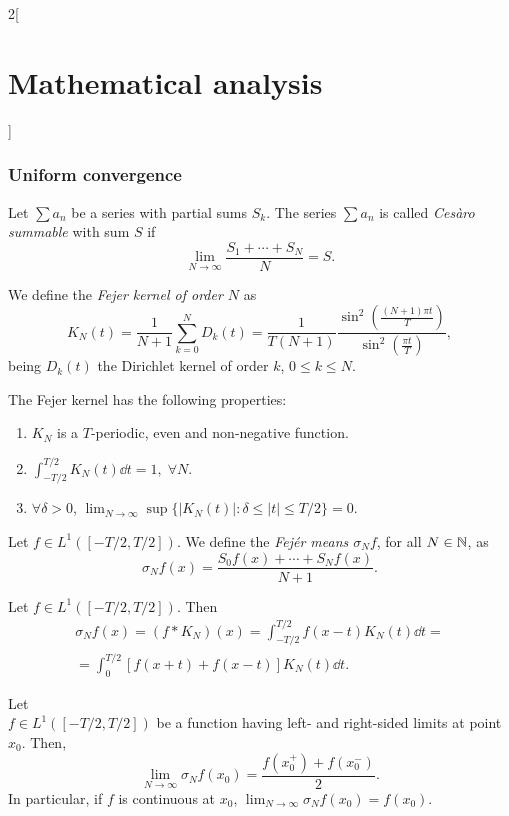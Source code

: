\documentclass[../../../main.tex]{subfiles}
\begin{document}
\begin{multicols}{2}[\section{Mathematical analysis}]
\subsubsection*{Uniform convergence}
\begin{definition}
Let $\sum a_n$ be a series with partial sums $S_k$. The series $\sum a_n$ is called \textit{Cesàro summable} with sum $S$ if $$\lim_{N\to\infty}\frac{S_1+\cdots+S_N}{N}=S.$$
\end{definition}
\begin{definition}
We define the \textit{Fejer kernel of order $N$} as $$K_N(t)=\frac{1}{N+1}\sum_{k=0}^ND_k(t)=\frac{1}{T(N+1)}\frac{\sin^2\left(\frac{(N+1)\pi t}{T}\right)}{\sin^2\left(\frac{\pi t}{T}\right)},$$ being $D_k(t)$ the Dirichlet kernel of order $k$, $0\leq k\leq N$.
\end{definition}
\begin{prop}
The Fejer kernel has the following properties:
\begin{enumerate}
    \item $K_N$ is a $T$-periodic, even and non-negative function.
    \item $\displaystyle\int_{-T/2}^{T/2}K_N(t)\dd t=1,\;\forall N$.
    \item $\forall\delta>0$, $\displaystyle\lim_{N\to\infty}\sup\{|K_N(t)|:\delta\leq|t|\leq T/2\}=0$.
\end{enumerate}
\end{prop}
\begin{definition}
Let $f\in L^1([-T/2,T/2])$. We define the \textit{Fejér means $\sigma_Nf$}, for all $N\in\mathbb{N} $, as $$\sigma_Nf(x)=\frac{S_0f(x)+\cdots+S_Nf(x)}{N+1}.$$
\end{definition}
\begin{prop}
Let $f\in L^1([-T/2,T/2])$. Then \begin{multline*}\sigma_Nf(x)=(f*K_N)(x)=\int_{-T/2}^{T/2}f(x-t)K_N(t)\dd t=\\=\int_0^{T/2}[f(x+t)+f(x-t)]K_N(t)\dd t.\end{multline*}
\end{prop}
\begin{theorem}
Let \\$f\in L^1([-T/2,T/2])$ be a function having left- and right-sided limits at point $x_0$. Then, $$\lim_{N\to\infty}\sigma_Nf(x_0)=\frac{f(x_0^+)+f(x_0^-)}{2}.$$ In particular, if $f$ is continuous at $x_0$, $\displaystyle\lim_{N\to\infty}\sigma_Nf(x_0)=f(x_0).$
\end{theorem}
\begin{theorem}

\end{theorem}
\end{multicols}
\end{document}
